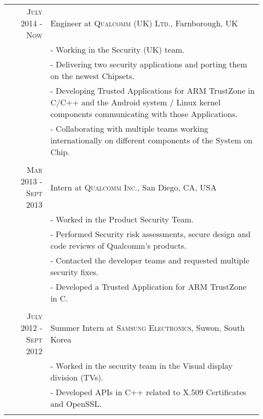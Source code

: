 \documentclass[a4paper,10pt]{article} %
\begin{document}
\begin{tabular}{r|p{11cm}}
    \textsc{July 2014 - Now} & Engineer at \textsc{Qualcomm (UK) Ltd.}, Farnborough, UK\\ 
                              & \footnotesize{
                                - Working in the Security (UK) team.} \\
                              & \footnotesize{
                                - Delivering two security applications and
                                porting them on the newest Chipsets.}\\
                              & \footnotesize{
                                - Developing Trusted Applications for ARM
                                TrustZone in C/C++ and the Android system /
                                Linux kernel components
                                communicating with those Applications.} \\
                              & \footnotesize{
                                - Collaborating with
                                multiple teams working internationally on
                                different components of the System on Chip.}\\
\multicolumn{2}{c}{} \\


\textsc{Mar 2013 - Sept 2013} & Intern at \textsc{Qualcomm Inc.}, San Diego, CA, USA\\ 
                              & \footnotesize{
                                - Worked in the Product Security Team.} \\ 
                              & \footnotesize{
                                - Performed Security risk assessments, secure
                            design and code reviews of Qualcomm's products.}\\
                              & \footnotesize{
                                - Contacted the developer teams and
                            requested multiple security fixes.} \\
                              & \footnotesize{
                                - Developed a Trusted Application for ARM TrustZone in C.}\\
\multicolumn{2}{c}{} \\


\textsc{July 2012 - Sept 2012} & Summer Intern at \textsc{Samsung Electronics}, Suwon, South Korea \emph{}\\
                               & \footnotesize{
                                 - Worked in the security team in the Visual
                             display division (TVs). } \\
                               & \footnotesize{
                                 - Developed APIs in C++
                                 related to X.509 Certificates and OpenSSL.}\\
\multicolumn{2}{c}{} \\


\end{tabular}
\end{document}
